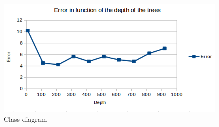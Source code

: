 \begin{figure}[h]
 \centering
 \includegraphics[scale=0.5]{../images/RFPO.png}
 \caption{Class diagram}
\end{figure}
